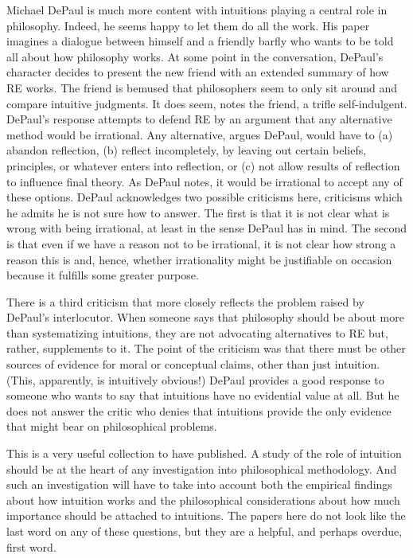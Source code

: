 \documentclass[
  11pt,
  letterpaper,
  DIV=11,
  numbers=noendperiod,
  oneside]{scrartcl}
\begin{document}
Michael DePaul is much more content with intuitions playing a central
role in philosophy. Indeed, he seems happy to let them do all the work.
His paper imagines a dialogue between himself and a friendly barfly who
wants to be told all about how philosophy works. At some point in the
conversation, DePaul's character decides to present the new friend with
an extended summary of how RE works. The friend is bemused that
philosophers seem to only sit around and compare intuitive judgments. It
does seem, notes the friend, a trifle self-indulgent. DePaul's response
attempts to defend RE by an argument that any alternative method would
be irrational. Any alternative, argues DePaul, would have to (a) abandon
reflection, (b) reflect incompletely, by leaving out certain beliefs,
principles, or whatever enters into reflection, or (c) not allow results
of reflection to influence final theory. As DePaul notes, it would be
irrational to accept any of these options. DePaul acknowledges two
possible criticisms here, criticisms which he admits he is not sure how
to answer. The first is that it is not clear what is wrong with being
irrational, at least in the sense DePaul has in mind. The second is that
even if we have a reason not to be irrational, it is not clear how
strong a reason this is and, hence, whether irrationality might be
justifiable on occasion because it fulfills some greater purpose.

There is a third criticism that more closely reflects the problem raised
by DePaul's interlocutor. When someone says that philosophy should be
about more than systematizing intuitions, they are not advocating
alternatives to RE but, rather, supplements to it. The point of the
criticism was that there must be other sources of evidence for moral or
conceptual claims, other than just intuition. (This, apparently, is
intuitively obvious!) DePaul provides a good response to someone who
wants to say that intuitions have no evidential value at all. But he
does not answer the critic who denies that intuitions provide the only
evidence that might bear on philosophical problems.

This is a very useful collection to have published. A study of the role
of intuition should be at the heart of any investigation into
philosophical methodology. And such an investigation will have to take
into account both the empirical findings about how intuition works and
the philosophical considerations about how much importance should be
attached to intuitions. The papers here do not look like the last word
on any of these questions, but they are a helpful, and perhaps overdue,
first word.
\end{document}
